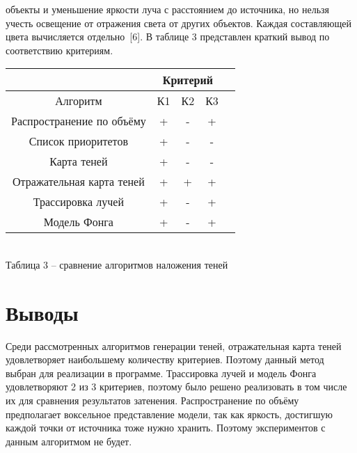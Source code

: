 {{        объекты и уменьшение яркости луча с расстоянием до источника,
        но нельзя учесть освещение от отражения света от других объектов.
        Каждая составляющей цвета вычисляется отдельно~[6].
    }
    В таблице 3 представлен краткий вывод по соответствию критериям.
    \begin{center}
        \begin{tabular} { |c|c|c|c|c| }
            \hline
            \hspace{0pt} & \multicolumn{3}{|c|}{Критерий} \\
            \hline
            Алгоритм & К1 & К2 & К3 \\
            \hline
            Распространение по объёму & + & - & + \\
            \hline
            Список приоритетов & + & - & -  \\
            \hline
            Карта теней & + & - & - \\
            \hline
            Отражательная карта теней & + & + & + \\
            \hline
            Трассировка лучей & + & - & + \\
            \hline
            Модель Фонга & + & - & + \\
            \hline
        \end{tabular}
        \\
        \vspace{2mm}
        \small { Таблица 3 -- сравнение алгоритмов наложения теней }
    \end{center}
    
    \section*{Выводы} {
        Среди рассмотренных алгоритмов генерации теней, отражательная карта теней
        удовлетворяет наибольшему количеству критериев.
        Поэтому данный метод выбран для реализации в программе.
        Трассировка лучей и модель Фонга удовлетворяют 2 из 3 критериев, поэтому
        было решено реализовать в том числе их для сравнения результатов
        затенения.
        Распространение по объёму предполагает воксельное представление модели,
        так как яркость, достигшую каждой точки от источника тоже нужно хранить.
        Поэтому экспериментов с данным алгоритмом не будет.
    }
}